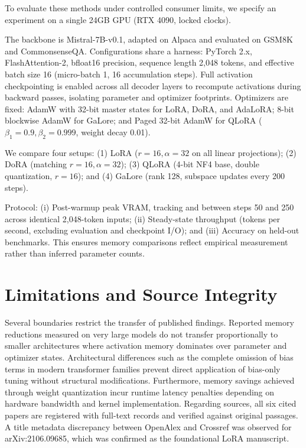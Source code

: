\documentclass[11pt,a4paper]{article}
\begin{document}
To evaluate these methods under controlled consumer limits, we specify an experiment on a single 24GB GPU (RTX 4090, locked clocks).

The backbone is Mistral-7B-v0.1, adapted on Alpaca and evaluated on GSM8K and CommonsenseQA. Configurations share a harness: PyTorch 2.x, Flash\-Attention-2, bfloat16 precision, sequence length 2,048 tokens, and effective batch size 16 (micro-batch 1, 16 accumulation steps). Full activation checkpointing is enabled across all decoder layers to recompute activations during backward passes, isolating parameter and optimizer footprints. Optimizers are fixed: AdamW with 32-bit master states for LoRA, DoRA, and AdaLoRA; 8-bit blockwise AdamW for GaLore; and Paged 32-bit AdamW for QLoRA ($\beta_1=0.9, \beta_2=0.999$, weight decay 0.01).

We compare four setups: (1) LoRA ($r=16, \alpha=32$ on all linear projections); (2) DoRA (matching $r=16, \alpha=32$); (3) QLoRA (4-bit NF4 base, double quantization, $r=16$); and (4) GaLore (rank 128, subspace updates every 200 steps).

Protocol: (i) Post-warmup peak VRAM, tracking  and  between steps 50 and 250 across identical 2,048-token inputs; (ii) Steady-state throughput (tokens per second, excluding evaluation and checkpoint I/O); and (iii) Accuracy on held-out benchmarks. This ensures memory comparisons reflect empirical measurement rather than inferred parameter counts.

\section*{Limitations and Source Integrity}

Several boundaries restrict the transfer of published findings. Reported memory reductions measured on very large models do not transfer proportionally to smaller architectures where activation memory dominates over parameter and optimizer states. Architectural differences such as the complete omission of bias terms in modern transformer families prevent direct application of bias-only tuning without structural modifications. Furthermore, memory savings achieved through weight quantization incur runtime latency penalties depending on hardware bandwidth and kernel implementation. Regarding sources, all six cited papers are registered with full-text records and verified against original passages. A title metadata discrepancy between OpenAlex and Crossref was observed for arXiv:2106.09685, which was confirmed as the foundational LoRA manuscript.



\end{document}
